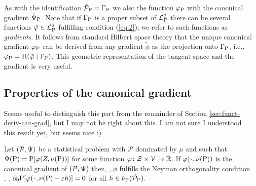 \documentclass[a4,danish]{article}
\begin{document}
As with the identification $\dot{\mathcal{P}}_{\P}= \Gamma_{\P}$ we
also  the function $\phi_{\P}$ with the canonical
gradient $\dot{\TT}_{\P}$. Note that if $\Gamma_{\P}$ is a proper
subset of $\lp$ there can be several functions $\tilde{\phi} \in \lp$
fulfilling condition (\ref{eq:2}); we refer to such functions as
\textit{gradients}. It follows from standard Hilbert space theory that
the unique canonical gradient $\phi_{\P}$ can be derived from any
gradient $\tilde{\phi}$ as the projection onto $\Gamma_{\P}$, i.e.,
$ \phi_{\P} = \Pi(\tilde{\phi} \mid \Gamma_{\P})$. This geometric
representation of the tangent space and the gradient is very useful.

\subsection{Properties of the canonical gradient}
\label{sec:prop-canon-grad}

Seems useful to distinguish this part from the remainder of Section
\ref{sec:funct-deriv-can-grad}, but I may not be right about this. I am
not sure I understood this result yet, but seems nice :)


\begin{proposition}
  \label{prop:eif-no}
  Let $(\mathcal{P}, \TT)$ be a statistical problem with $\mathcal{P}$ dominated by $\mu$ and such
  that $\TT(\P) = \P[\phi(Z, \nu(\P))]$ for some function
  $\phi\colon \mathcal{Z} \times \mathcal{V} \rightarrow \R$. If $\phi(\blank, \nu(\P))$ is the
  canonical gradient of $(\mathcal{P}, \TT)$ then, , $\phi$ fulfills the Neyman orthogonality condition ,
  ,
  $\partial_0 \P[\phi(\blank, \nu(\P) + \epsilon h)] = 0$ for all
  $h \in \dot{\nu}_{\P}(\dot{\mathcal{P}}_{\P})$.
\end{proposition}

\end{document}

